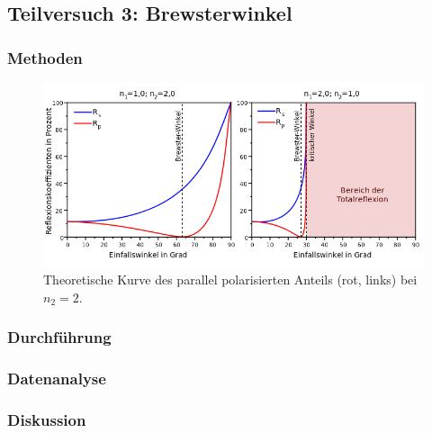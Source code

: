 \subsection{Teilversuch 3: Brewsterwinkel}

	\subsubsection*{Methoden}
		
		
		\begin{figure}[ht]
			\centering
			\includegraphics[width=\textwidth]{bilder/wikiBrewster.png}
			\caption{Theoretische Kurve des parallel polarisierten Anteils (rot, links) bei $n_2 = 2$. \cite{wikiBrewster}}
			\label{fig:wiki_brewster}	
		\end{figure}
				
		
	\subsubsection*{Durchführung}
	
	
	\subsubsection*{Datenanalyse}
		
	
	\subsubsection*{Diskussion}
	
